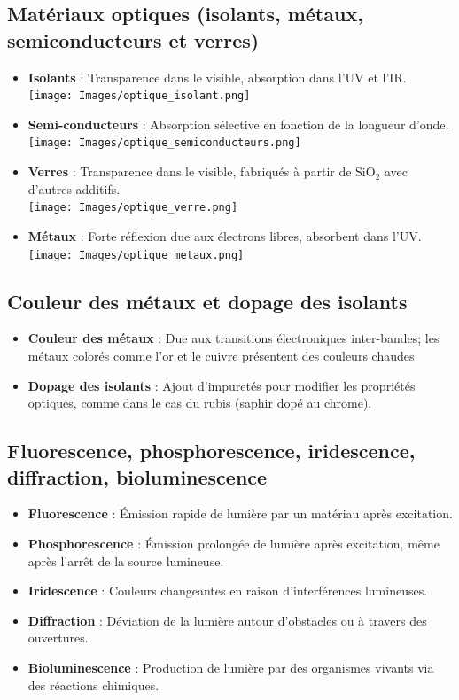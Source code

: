 \documentclass{article}
\begin{document}
    \subsection{Matériaux optiques (isolants, métaux, semiconducteurs et verres)}
    \begin{itemize}
        \item \textbf{Isolants} : Transparence dans le visible, absorption dans l'UV et l'IR. \\
            \texttt{[image: Images/optique\_isolant.png]}
        \item \textbf{Semi-conducteurs} : Absorption sélective en fonction de la longueur d'onde. \\
            \texttt{[image: Images/optique\_semiconducteurs.png]}
        \item \textbf{Verres} : Transparence dans le visible, fabriqués à partir de SiO$_2$ avec d'autres additifs. \\
            \texttt{[image: Images/optique\_verre.png]}
        \item \textbf{Métaux} : Forte réflexion due aux électrons libres, absorbent dans l'UV. \\
            \texttt{[image: Images/optique\_metaux.png]}
    \end{itemize}
    
    \subsection{Couleur des métaux et dopage des isolants}
    \begin{itemize}
        \item \textbf{Couleur des métaux} : Due aux transitions électroniques inter-bandes; les métaux colorés comme l'or et le cuivre présentent des couleurs chaudes.
        \item \textbf{Dopage des isolants} : Ajout d'impuretés pour modifier les propriétés optiques, comme dans le cas du rubis (saphir dopé au chrome).
    \end{itemize}
    
    \subsection{Fluorescence, phosphorescence, iridescence, diffraction, bioluminescence}
    \begin{itemize}
        \item \textbf{Fluorescence} : Émission rapide de lumière par un matériau après excitation.
        \item \textbf{Phosphorescence} : Émission prolongée de lumière après excitation, même après l'arrêt de la source lumineuse.
        \item \textbf{Iridescence} : Couleurs changeantes en raison d'interférences lumineuses.
        \item \textbf{Diffraction} : Déviation de la lumière autour d'obstacles ou à travers des ouvertures.
        \item \textbf{Bioluminescence} : Production de lumière par des organismes vivants via des réactions chimiques.
    \end{itemize}
\end{document}
